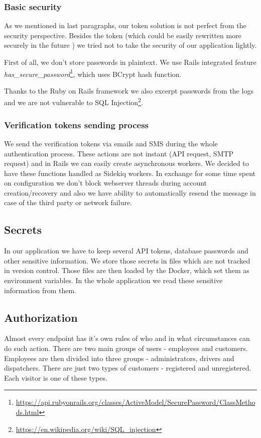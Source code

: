 \subsubsection{Basic security}
	As we mentioned in last paragraphs, our token solution is not perfect from the security perspective. Besides the token (which could be easily rewritten more securely in the future ) we tried not to take the security of our application lightly.
	
	First of all, we don't store passwords in plaintext. We use Rails integrated feature \textit{has\_secure\_password}\footnote{\url{https://api.rubyonrails.org/classes/ActiveModel/SecurePassword/ClassMethods.html}}, which uses BCrypt hash function.
	
	Thanks to the Ruby on Rails framework we also excerpt passwords from the logs and we are not vulnerable to SQL Injection\footnote{\url{https://en.wikipedia.org/wiki/SQL\_injection}}.

\subsubsection{Verification tokens sending process}
	We send the verification tokens via emails and SMS during the whole authentication process. These actions are not instant (API request, SMTP request) and in Rails we can easily create asynchronous workers. We decided to have these functions handled as Sidekiq workers. In exchange for some time spent on configuration we don't block webserver threads during account creation/recovery and also we have ability to automatically resend the message in case of the third party or network failure.

\subsection{Secrets}
	In our application we have to keep several API tokens, database passwords and other sensitive information. We store those secrets in files which are not tracked in version control. Those files are then loaded by the Docker, which set them as environment variables. In the whole application we read these sensitive information from them.  

\subsection{Authorization}
Almost every endpoint has it's own rules of who and in what circumstances can do such action. There are two main groups of users - employees and customers. Employees are then divided into three groups - administrators, drivers and dispatchers. There are just two types of customers - registered and unregistered. Each visitor is one of these types.

